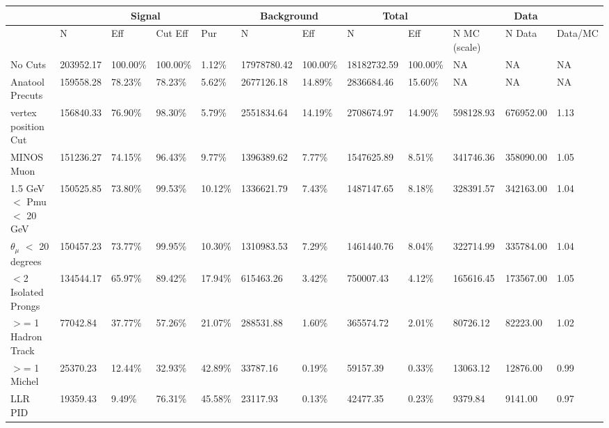 \begin{table}[!hbt]
    \tiny
    \centering
    \begin{tabular}{|*{12}{l|}}


    \hline
    & \multicolumn{4}{c|}{Signal} & \multicolumn{2}{c|}{Background} & \multicolumn{2}{c|}{Total} & \multicolumn{3}{c|}{Data} \\
    \hline
& N     & Eff     & Cut Eff & Pur    & N         & Eff     & N         & Eff     & N MC (scale) & N Data    & Data/MC \\\hline

 No Cuts   & 203952.17     & 100.00\% & 100.00\% &   1.12\% & 17978780.42 & 100.00\% & 18182732.59 & 100.00\% & NA & NA & NA \\ \hline
 Anatool Precuts   & 159558.28     &  78.23\% &  78.23\% &   5.62\% & 2677126.18 &  14.89\% & 2836684.46 &  15.60\% & NA & NA & NA \\ \hline
 vertex position Cut   & 156840.33     &  76.90\% &  98.30\% &   5.79\% & 2551834.64 &  14.19\% & 2708674.97     &  14.90\% & 598128.93     & 676952.00 &   1.13 \\ \hline
 MINOS Muon   & 151236.27     &  74.15\% &  96.43\% &   9.77\% & 1396389.62 &   7.77\% & 1547625.89     &   8.51\% & 341746.36     & 358090.00 &   1.05 \\ \hline
 1.5 GeV $<$ Pmu $<$ 20 GeV   & 150525.85     &  73.80\% &  99.53\% &  10.12\% & 1336621.79 &   7.43\% & 1487147.65     &   8.18\% & 328391.57     & 342163.00 &   1.04 \\ \hline
 $\theta_{\mu}$ $<$ 20 degrees   & 150457.23     &  73.77\% &  99.95\% &  10.30\% & 1310983.53 &   7.29\% & 1461440.76     &   8.04\% & 322714.99     & 335784.00 &   1.04 \\ \hline
 $<$2 Isolated Prongs   & 134544.17     &  65.97\% &  89.42\% &  17.94\% & 615463.26 &   3.42\% & 750007.43     &   4.12\% & 165616.45     & 173567.00 &   1.05 \\ \hline
 $>$= 1 Hadron Track   & 77042.84     &  37.77\% &  57.26\% &  21.07\% & 288531.88 &   1.60\% & 365574.72     &   2.01\% & 80726.12     & 82223.00 &   1.02 \\ \hline
 $>$= 1 Michel   & 25370.23     &  12.44\% &  32.93\% &  42.89\% & 33787.16 &   0.19\% & 59157.39     &   0.33\% & 13063.12     & 12876.00 &   0.99 \\ \hline
 LLR PID   & 19359.43     &   9.49\% &  76.31\% &  45.58\% & 23117.93 &   0.13\% & 42477.35     &   0.23\% & 9379.84     & 9141.00 &   0.97 \\ \hline

\end{tabular}
\end{table}
